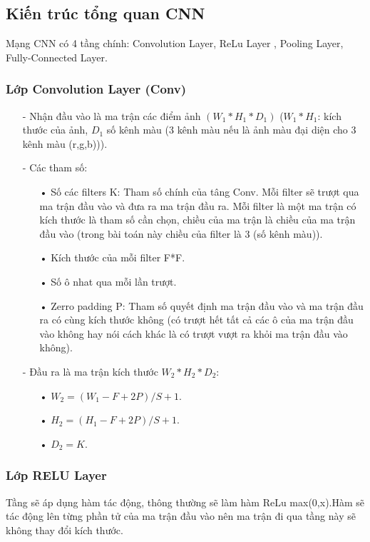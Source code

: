 \documentclass[a4paper,12pt]{report}
\begin{document}
\subsection{Kiến trúc tổng quan CNN}
Mạng CNN có 4 tầng chính: Convolution Layer, ReLu Layer , Pooling Layer, Fully-Connected Layer.
\subsubsection{Lớp Convolution Layer (Conv)}
\begin{itemize}
\item[-] Nhận đầu vào là ma trận các điểm ảnh $(W_1*H_1*D_1)$ ($W_1*H_1$: kích thước của ảnh, $D_1$ số kênh màu (3 kênh màu nếu là ảnh màu đại diện cho 3 kênh màu (r,g,b))).
\item[-] Các tham số:
\begin{itemize}
\item[•] Số các filters K: Tham số chính của tâng Conv. Mỗi filter sẽ trượt qua ma trận đầu vào và đưa ra ma trận đầu ra. Mỗi filter là một ma trận có kích thước là tham số cần chọn, chiều của ma trận là chiều của ma trận đầu vào (trong bài toán này chiều của filter là 3 (số kênh màu)).
\item[•] Kích thước của mỗi filter F*F.
\item[•] Số ô nhat qua mỗi lần trượt.
\item[•] Zerro padding P: Tham số quyết định ma trận đầu vào và ma trận đầu ra có cùng kích thước không (có trượt hết tất cả các ô của ma trận đầu vào không hay nói cách khác là có trượt vượt ra khỏi ma trận đầu vào không).
\end{itemize}
\item[-] Đầu ra là ma trận kích thước $W_2*H_2*D_2$:
\begin{itemize}
\item[•] $W_2 = (W_1 - F + 2P)/S + 1$.
\item[•] $H_2 = (H_1 - F + 2P)/S + 1$.
\item[•] $D_2 = K$.
\end{itemize}
\end{itemize}
\subsubsection{Lớp RELU Layer}
Tầng sẽ áp dụng hàm tác động, thông thường sẽ làm hàm ReLu max(0,x).Hàm sẽ tác động lên từng phần tử của ma trận đầu vào nên ma trận đi qua tầng này sẽ không thay đổi kích thước.
\end{document}
